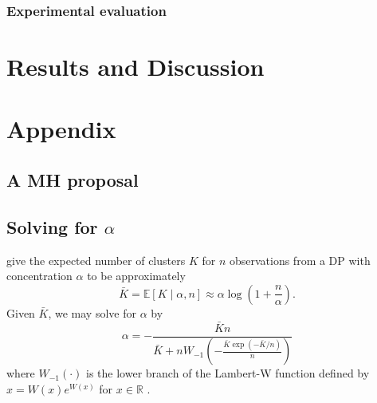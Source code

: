 \documentclass{uwstat572}
\begin{document}
\subsubsection{Experimental evaluation}


\section{Results and Discussion}





\section{Appendix}

\subsection{A MH proposal}



\subsection{Solving for $\alpha$}

\citet{HA07} give the expected number of clusters $K$ for $n$ observations from a DP with concentration $\alpha$ to be approximately
\begin{equation}
\bar{K} = \mathbb{E}\left[K \mid \alpha, n\right] \approx \alpha \log{\left(1 + \frac{n}{\alpha}\right)}.
\end{equation}
Given $\bar{K}$, we may solve for $\alpha$ by
\begin{equation}
\alpha = - \frac{\bar{K} n}{\bar{K} + n W_{-1}\left(-\frac{\bar{K}\exp\left(-\bar{K}/n\right)}{n}\right)}
\end{equation}
where $W_{-1}\left(\cdot\right)$ is the lower branch of the Lambert-W function defined by $x = W\left(x\right)e^{W\left(x\right)}$ for $x \in \mathbb{R}$ \citep{Cor+96}.
\end{document}
